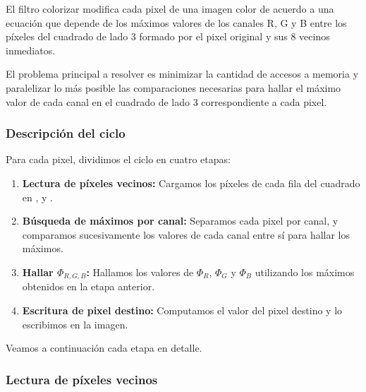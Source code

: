 El filtro colorizar modifica cada pixel de una imagen color de acuerdo a una ecuación que depende
de los máximos valores de los canales R, G y B entre los píxeles del cuadrado de lado 3 formado
por el pixel original y sus 8 vecinos inmediatos.

El problema principal a resolver es minimizar la cantidad de accesos a memoria y paralelizar lo más
posible las comparaciones necesarias para hallar el máximo valor de cada canal en el cuadrado
de lado 3 correspondiente a cada pixel.




\subsubsection{Descripción del ciclo}

Para cada pixel, dividimos el ciclo en cuatro etapas:

\begin{enumerate}
    \item \textbf{Lectura de píxeles vecinos:}
        Cargamos los píxeles de cada fila del cuadrado en ,  y .
    \item \textbf{Búsqueda de máximos por canal:}
        Separamos cada pixel por canal, y comparamos sucesivamente los valores de cada canal
        entre sí para hallar los máximos.
    \item \textbf{Hallar $\Phi_{R,G,B}$:}
        Hallamos los valores de $\Phi_R$, $\Phi_G$ y $\Phi_B$ utilizando los máximos
        obtenidos en la etapa anterior.
    \item \textbf{Escritura de pixel destino:}
        Computamos el valor del pixel destino y lo escribimos en la imagen.
\end{enumerate}

Veamos a continuación cada etapa en detalle.




\subsubsection{Lectura de píxeles vecinos}

